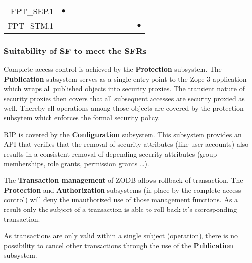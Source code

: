\documentclass[12pt,english]{scrbook}
\newcommand{\oh}{$\bullet$}
\begin{document}
\begin{table}
\begin{tabular}{rRRRRRRRRRR}
FPT\_SEP.1          &  \oh       &                &               &          &               &                        &      &                    &                 &                    \\ 
FPT\_STM.1          &            &                &               &          &               &                        &      &                    &                 &   \oh              \\        \bottomrule
    \end{tabular}
\end{table}

\subsubsection{Suitability of SF to meet the SFRs}


Complete access control is achieved by the \textbf{Protection} subsystem. The
\textbf{Publication} subsystem serves as a single entry point to the Zope 3
application which wraps all published objects into security proxies. The
transient nature of security proxies then covers that all subsequent accesses
are security proxied as well. Thereby all operations among those objects are
covered by the protection subsytem which enforces the formal security policy.


RIP is covered by the \textbf{Configuration} subsystem. This subsystem provides
an API that verifies that the removal of security attributes (like user
accounts) also results in a consistent removal of depending security attributes
(group memberships, role grants, permission grants \ldots).


The \textbf{Transaction management} of ZODB allows rollback of transaction. The
\textbf{Protection} and \textbf{Authorization} subsystems (in place by the
complete access control) will deny the unauthorized use of those management
functions. As a result only the subject of a transaction is able to roll back
it's corresponding transaction.

As transactions are only valid within a single subject (operation), there is no
possibility to cancel other transactions through the use of the
\textbf{Publication} subsystem.
\end{document}
